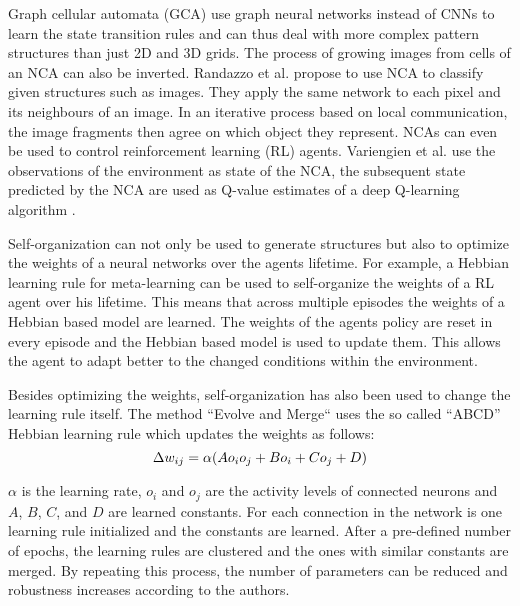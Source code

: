 Graph cellular automata (GCA) use graph neural networks  instead of CNNs to learn the state transition rules and can thus deal with more complex pattern structures than just 2D and 3D grids.
The process of growing images from cells of an NCA can also be inverted.
Randazzo et al.  propose to use NCA to classify given structures such as images.
They apply the same network to each pixel and its neighbours of an image.
In an iterative process based on local communication, the image fragments then agree on which object they represent.
NCAs can even be used to control reinforcement learning (RL) agents.
Variengien et al.  use the observations of the environment as state of the NCA, the subsequent state predicted by the NCA are used as Q-value estimates of a deep Q-learning algorithm .

Self-organization can not only be used to generate structures but also to optimize the weights of a neural networks over the agents lifetime.
For example, a Hebbian learning rule for meta-learning can be used to self-organize the weights of a RL agent over his lifetime.
This means that across multiple episodes the weights of a Hebbian based model are learned.
The weights of the agents policy are reset in every episode and the Hebbian based model is used to update them.
This allows the agent to adapt better to the changed conditions within the environment.

Besides optimizing the weights, self-organization has also been used to change the learning rule itself.
The method ``Evolve and Merge``  uses the so called ``ABCD'' Hebbian learning rule which updates the weights as follows:
\begin{equation}\eqlbl{McCulloch_Pitts_act}
	\Delta w_{ij} = \alpha (A o_i o_j + B o_i + C o_j + D)
\end{equation}%

$\alpha$ is the learning rate, $o_i$ and $o_j$ are the activity levels of connected neurons and $A$, $B$, $C$, and $D$ are learned constants.
For each connection in the network is one learning rule initialized and the constants are learned.
After a pre-defined number of epochs, the learning rules are clustered and the ones with similar constants are merged.
By repeating this process, the number of parameters can be reduced and robustness increases according to the authors.

